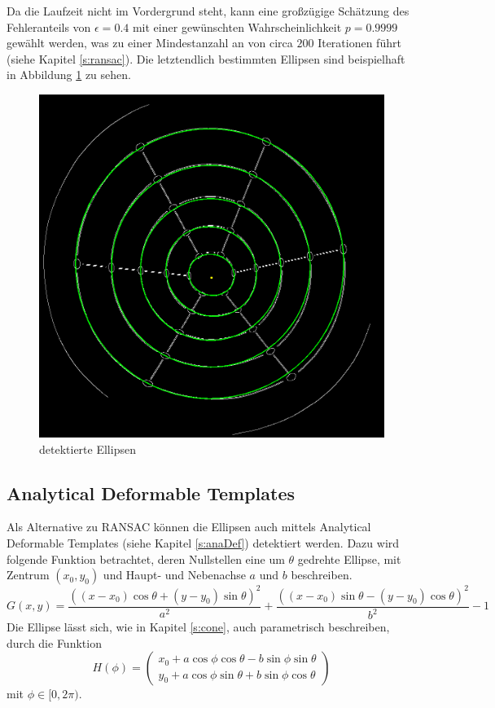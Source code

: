 Da die Laufzeit nicht im Vordergrund steht, kann eine großzügige Schätzung des Fehleranteils von $\epsilon = 0.4$ mit einer gewünschten Wahrscheinlichkeit $p = 0.9999$ gewählt werden, was zu einer Mindestanzahl an von circa $200$ Iterationen führt (siehe Kapitel \ref{s:ransac}). Die letztendlich bestimmten Ellipsen sind beispielhaft in Abbildung \ref{fig:detectedEllipses} zu sehen.

\begin{figure}[!htb]
	\centering
	\includegraphics[scale=.25]{images/detectedEllipses.png}
	\caption{detektierte Ellipsen}
	\label{fig:detectedEllipses}
\end{figure}

\FloatBarrier
\subsection{Analytical Deformable Templates}

Als Alternative zu RANSAC können die Ellipsen auch mittels Analytical Deformable Templates (siehe Kapitel \ref{s:anaDef}) detektiert werden. Dazu wird folgende Funktion betrachtet, deren Nullstellen eine um $\theta$ gedrehte Ellipse, mit Zentrum $(x_0,y_0)$ und Haupt- und Nebenachse $a$ und $b$ beschreiben.
\[
	G(x,y) = \frac{((x - x_0)\cos\theta + (y - y_0)\sin\theta)^2}{a^2} + \frac{((x - x_0)\sin\theta - (y - y_0)\cos\theta)^2}{b^2} - 1
\] %
Die Ellipse lässt sich, wie in Kapitel \ref{s:cone}, auch parametrisch beschreiben, durch die Funktion
\[
H(\phi) = \begin{pmatrix}x_0 + a\cos\phi\cos\theta - b\sin\phi\sin\theta \\
y_0 + a\cos\phi\sin\theta + b\sin\phi\cos\theta\end{pmatrix}
\] %
mit $\phi \in [0,2\pi)$.

